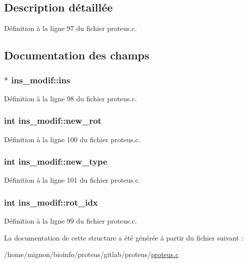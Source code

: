 \subsection{Description détaillée}


Définition à la ligne 97 du fichier proteus.\+c.



\subsection{Documentation des champs}
\hypertarget{structins__modif_a5689a41b8f7b378f7187fdeae3a210e0}{
\subsubsection[{ins}]{$\ast$ ins\+\_\+modif\+::ins}}\label{structins__modif_a5689a41b8f7b378f7187fdeae3a210e0}


Définition à la ligne 98 du fichier proteus.\+c.

\hypertarget{structins__modif_a4d936fd6ef4e1615c33327618fef7024}{
\subsubsection[{new\+\_\+rot}]{\setlength{\rightskip}{0pt plus 5cm}int ins\+\_\+modif\+::new\+\_\+rot}}\label{structins__modif_a4d936fd6ef4e1615c33327618fef7024}


Définition à la ligne 100 du fichier proteus.\+c.

\hypertarget{structins__modif_a0d6761ef9ddc5ecaa75780a5944bd1b0}{
\subsubsection[{new\+\_\+type}]{\setlength{\rightskip}{0pt plus 5cm}int ins\+\_\+modif\+::new\+\_\+type}}\label{structins__modif_a0d6761ef9ddc5ecaa75780a5944bd1b0}


Définition à la ligne 101 du fichier proteus.\+c.

\hypertarget{structins__modif_a17e374de72b7a12b94a3a944cd09f3d8}{
\subsubsection[{rot\+\_\+idx}]{\setlength{\rightskip}{0pt plus 5cm}int ins\+\_\+modif\+::rot\+\_\+idx}}\label{structins__modif_a17e374de72b7a12b94a3a944cd09f3d8}


Définition à la ligne 99 du fichier proteus.\+c.



La documentation de cette structure a été générée à partir du fichier suivant \+:\begin{DoxyCompactItemize}
\item 
/home/mignon/bioinfo/proteus/gitlab/proteus/\hyperlink{proteus_8c}{proteus.\+c}\end{DoxyCompactItemize}
